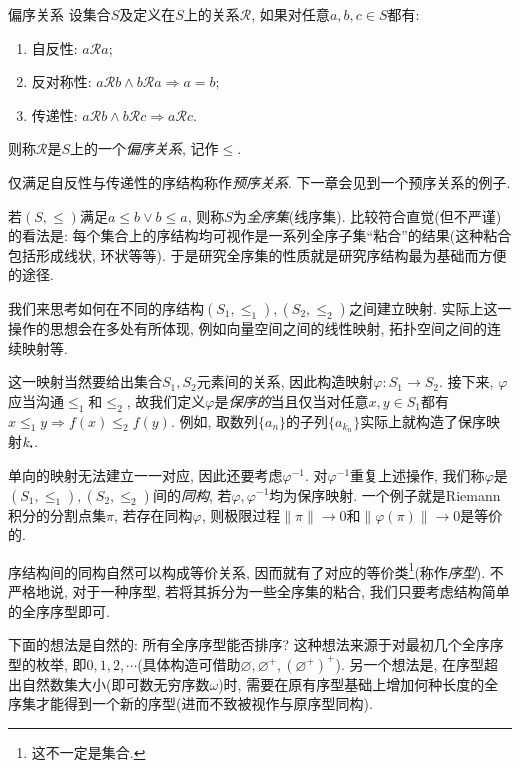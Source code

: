 \begin{definition}{偏序关系}
	设集合$S$及定义在$S$上的关系$\mathcal{R}$, 如果对任意$a, b, c \in S$都有: 
	\begin{enumerate}
		\item 自反性: $a\mathcal{R} a$; 
		\item 反对称性: $a\mathcal{R} b \wedge b\mathcal{R} a \Rightarrow a=b$; 
		\item 传递性: $a\mathcal{R} b \wedge b\mathcal{R} c \Rightarrow a\mathcal{R} c$.
	\end{enumerate}
	则称$\mathcal{R}$是$S$上的一个\textit{偏序关系}, 记作$\leq$.
\end{definition}
\begin{remark}
	仅满足自反性与传递性的序结构称作\textit{预序关系}. 下一章会见到一个预序关系的例子. 
\end{remark}
\begin{remark}
	若$(S,\leq)$满足$a \leq b \vee b \leq a$, 则称$S$为\textit{全序集}(线序集). 比较符合直觉(但不严谨)的看法是: 每个集合上的序结构均可视作是一系列全序子集“粘合”的结果(这种粘合包括形成线状, 环状等等). 于是研究全序集的性质就是研究序结构最为基础而方便的途径. 
\end{remark}

我们来思考如何在不同的序结构$(S_1,\leq _1),(S_2,\leq _2)$之间建立映射. 实际上这一操作的思想会在多处有所体现, 例如向量空间之间的线性映射, 拓扑空间之间的连续映射等. 

这一映射当然要给出集合$S_1,S_2$元素间的关系, 因此构造映射$\varphi :S_1 \to S_2$. 接下来, $\varphi$应当沟通$\leq _1$和$\leq _2$, 故我们定义$\varphi$是\textit{保序的}当且仅当对任意$x,y \in S_1$都有$x \leq _1 y \Rightarrow f(x) \leq _2 f(y)$. 例如, 取数列$\{ a_n \}$的子列$\{ a_{k_n} \}$实际上就构造了保序映射$k_{\bigcdot}$. 

单向的映射无法建立一一对应, 因此还要考虑$\varphi ^{-1}$. 对$\varphi ^{-1}$重复上述操作, 我们称$\varphi$是$(S_1,\leq _1),(S_2,\leq _2)$间的\textit{同构}, 若$\varphi ,\varphi ^{-1}$均为保序映射. 一个例子就是Riemann积分的分割点集$\pi$, 若存在同构$\varphi$, 则极限过程$\| \pi \| \to 0$和$\| \varphi(\pi) \| \to 0$是等价的. 

序结构间的同构自然可以构成等价关系, 因而就有了对应的等价类\footnote{这不一定是集合. }(称作\textit{序型}). 不严格地说, 对于一种序型, 若将其拆分为一些全序集的粘合, 我们只要考虑结构简单的全序序型即可. 

下面的想法是自然的: 所有全序序型能否排序? 这种想法来源于对最初几个全序序型的枚举, 即$0,1,2,\cdots$(具体构造可借助$\varnothing , \varnothing ^{+}, (\varnothing ^+)^+$). 另一个想法是, 在序型超出自然数集大小(即可数无穷序数$\omega$)时, 需要在原有序型基础上增加何种长度的全序集才能得到一个新的序型(进而不致被视作与原序型同构). 

